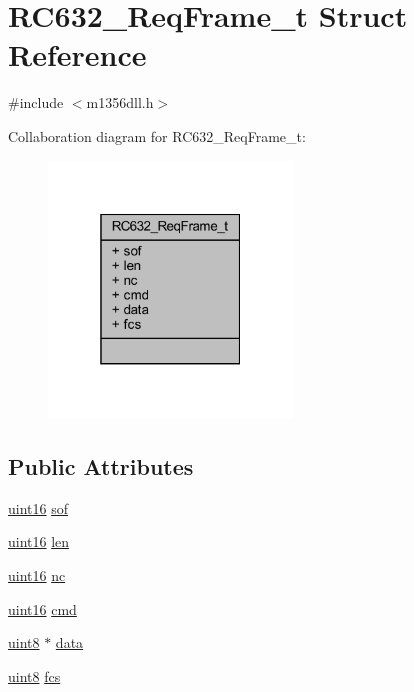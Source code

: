 \hypertarget{struct_r_c632___req_frame__t}{}\section{R\+C632\+\_\+\+Req\+Frame\+\_\+t Struct Reference}
\label{struct_r_c632___req_frame__t}


{\ttfamily \#include $<$m1356dll.\+h$>$}



Collaboration diagram for R\+C632\+\_\+\+Req\+Frame\+\_\+t\+:\nopagebreak
\begin{figure}[H]
\begin{center}
\leavevmode
\includegraphics[width=184pt]{struct_r_c632___req_frame__t__coll__graph}
\end{center}
\end{figure}
\subsection*{Public Attributes}
\begin{DoxyCompactItemize}
\item 
\mbox{\hyperlink{inc_2m1356dll_8h_a05f6b0ae8f6a6e135b0e290c25fe0e4e}{uint16}} \mbox{\hyperlink{struct_r_c632___req_frame__t_a737aa31dee20b759864099b808dbe156}{sof}}
\item 
\mbox{\hyperlink{inc_2m1356dll_8h_a05f6b0ae8f6a6e135b0e290c25fe0e4e}{uint16}} \mbox{\hyperlink{struct_r_c632___req_frame__t_a149ca47be10f9f2f248562e195e815de}{len}}
\item 
\mbox{\hyperlink{inc_2m1356dll_8h_a05f6b0ae8f6a6e135b0e290c25fe0e4e}{uint16}} \mbox{\hyperlink{struct_r_c632___req_frame__t_a09ca61a8ee262ee7c98669cd3226510b}{nc}}
\item 
\mbox{\hyperlink{inc_2m1356dll_8h_a05f6b0ae8f6a6e135b0e290c25fe0e4e}{uint16}} \mbox{\hyperlink{struct_r_c632___req_frame__t_a68d25a2924669c1db2505dfbd6fcb78c}{cmd}}
\item 
\mbox{\hyperlink{inc_2m1356dll_8h_adde6aaee8457bee49c2a92621fe22b79}{uint8}} $\ast$ \mbox{\hyperlink{struct_r_c632___req_frame__t_aca00c37781da56bd4e68c812bf58f52c}{data}}
\item 
\mbox{\hyperlink{inc_2m1356dll_8h_adde6aaee8457bee49c2a92621fe22b79}{uint8}} \mbox{\hyperlink{struct_r_c632___req_frame__t_a632b8737a5db3c9a947699c40345e165}{fcs}}
\end{DoxyCompactItemize}


